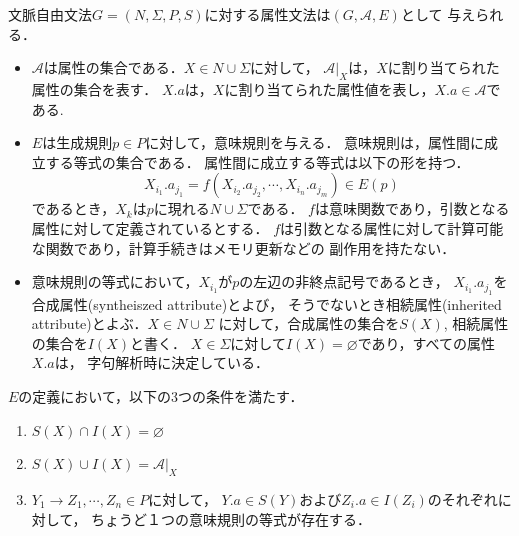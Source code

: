 \documentclass[dvipdfmx,a4j]{jbook}
\begin{document}
\begin{Def}
文脈自由文法$G=(N,\Sigma,P,S)$に対する属性文法は$(G,\mathcal{A},E)$として
与えられる．
\begin{itemize}
\item $\mathcal{A}$は属性の集合である．$X\in N\cup\Sigma$に対して，
$\mathcal{A}|_X$は，$X$に割り当てられた属性の集合を表す．
$X.a$は，$X$に割り当てられた属性値を表し，$X.a\in\mathcal{A}$である.
\item $E$は生成規則$p\in P$に対して，意味規則を与える．
意味規則は，属性間に成立する等式の集合である．
属性間に成立する等式は以下の形を持つ．
\[X_{i_1}.a_{j_1}=f(X_{i_2}.a_{j_2},\cdots,X_{i_n}.a_{j_m})\in E(p)\]
であるとき，$X_k$は$p$に現れる$N\cup\Sigma$である．
$f$は意味関数であり，引数となる属性に対して定義されているとする．
$f$は引数となる属性に対して計算可能な関数であり，計算手続きはメモリ更新などの
副作用を持たない．
\item 
意味規則の等式において，$X_{i_1}$が$p$の左辺の非終点記号であるとき，
$X_{i_1}.a_{j_1}$を合成属性(syntheiszed attribute)とよび，
そうでないとき相続属性(inherited attribute)とよぶ．$X\in N\cup\Sigma$
に対して，合成属性の集合を$S(X)$, 相続属性の集合を$I(X)$と書く．
$X\in\Sigma$に対して$I(X)=\varnothing$であり，すべての属性$X.a$は，
字句解析時に決定している．
\end{itemize}

$E$の定義において，以下の3つの条件を満たす．
\begin{enumerate}
\item $S(X)\cap I(X)=\varnothing$
\item $S(X)\cup I(X)=\mathcal{A}|_X$
\item $Y_1\rightarrow Z_1,\cdots,Z_n\in P$に対して，
$Y.a\in S(Y)$および$Z_i.a\in I(Z_i)$のそれぞれに対して，
ちょうど１つの意味規則の等式が存在する．
\end{enumerate}
\end{Def}
\end{document}
